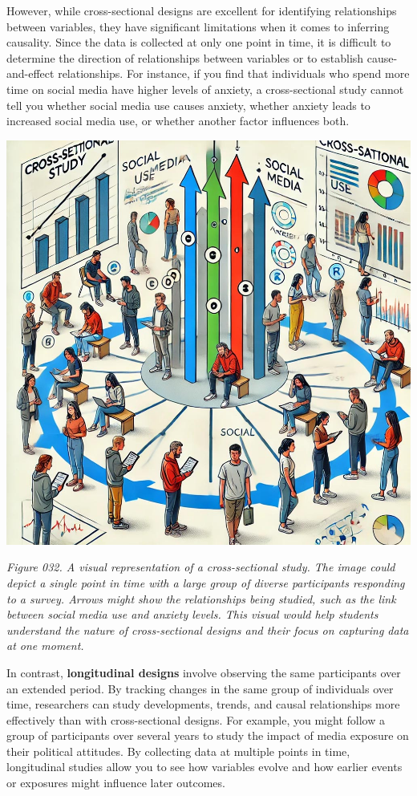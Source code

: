 \documentclass[
]{book}
\begin{document}
However, while cross-sectional designs are excellent for identifying relationships between variables, they have significant limitations when it comes to inferring causality. Since the data is collected at only one point in time, it is difficult to determine the direction of relationships between variables or to establish cause-and-effect relationships. For instance, if you find that individuals who spend more time on social media have higher levels of anxiety, a cross-sectional study cannot tell you whether social media use causes anxiety, whether anxiety leads to increased social media use, or whether another factor influences both.

\includegraphics[width=1\linewidth,height=\textheight,keepaspectratio]{images/fig032.jpg}

\emph{Figure 032. A visual representation of a cross-sectional study. The image could depict a single point in time with a large group of diverse participants responding to a survey. Arrows might show the relationships being studied, such as the link between social media use and anxiety levels. This visual would help students understand the nature of cross-sectional designs and their focus on capturing data at one moment.}

In contrast, \textbf{longitudinal designs} involve observing the same participants over an extended period. By tracking changes in the same group of individuals over time, researchers can study developments, trends, and causal relationships more effectively than with cross-sectional designs. For example, you might follow a group of participants over several years to study the impact of media exposure on their political attitudes. By collecting data at multiple points in time, longitudinal studies allow you to see how variables evolve and how earlier events or exposures might influence later outcomes.
\end{document}
